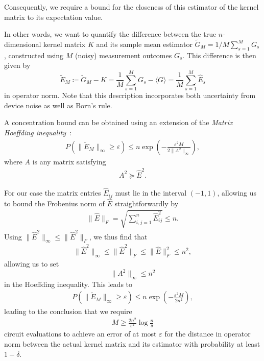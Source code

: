 \documentclass[twocolumn,superscriptaddress,nofootinbib]{revtex4-2}
\providecommand{\norm}[1]{\lVert #1 \rVert}
\renewcommand{\l}[0]{\langle}
\renewcommand{\r}[0]{\rangle}
\newcommand{\expval}[1]{\l #1 \r}
\begin{document}
    Consequently, we require a bound for the closeness of this estimator of the kernel matrix to its expectation value.
    
    In other words, we want to quantify the difference between the true $n$-dimensional kernel matrix $K$ and its sample mean estimator $\tilde{G}_M = 1/M\sum_{s=1}^M G_s$, constructed using $M$ (noisy) measurement outcomes $G_s$. This difference is then given by
    \begin{equation}
        \tilde{E}_M\coloneqq \tilde{G}_M-K = \frac{1}{M}\sum_{s=1}^M G_s - \expval{G}=\frac{1}{M}\sum_{s=1}^M\hat{E}_s
    \end{equation}
    in operator norm. Note that this description incorporates both uncertainty from device noise as well as Born's rule.
    
    A concentration bound can be obtained using an extension of the \emph{Matrix Hoeffding inequality}~\cite{troppUserfriendlyTailBounds2012a,mackeyMatrixConcentrationInequalities2014}:
    \begin{align}
        P(\lVert \tilde{E}_M \rVert_{\infty} \geq \varepsilon)
        \leq n \exp\left(- \frac{\varepsilon^2 M}{2 \norm{A^2}_{\infty}}\right),
    \end{align}
    where $A$ is any matrix satisfying
    \begin{align}
        A^2 \succcurlyeq \hat{E}^2.
    \end{align}

    For our case the matrix entries $\hat{E}_{ij}$ must lie in the interval $(-1,1)$, allowing us to bound the Frobenius norm of $\hat{E}$ straightforwardly by
    \begin{align}
        \lVert \hat{E} \rVert_F = \sqrt{\sum_{i,j=1}^n \hat{E}_{ij}^2} \leq n.
    \end{align}
    Using $\lVert \hat{E}^2 \rVert_\infty \leq \lVert \hat{E}^2 \rVert_F$, we thus find that 
    \begin{align}
        \lVert \hat{E}^2 \rVert_\infty \leq\lVert \hat{E}^2 \rVert_F \leq \lVert \hat{E}\rVert_F^2 \leq n^2,
    \end{align}
    allowing us to set
    \begin{equation}
        \norm{A^2}_{\infty}\leq n^2
    \end{equation}
    in the Hoeffding inequality. This leads to
        \begin{align}
        P(\lVert \tilde{E}_M \rVert_{\infty} \geq \varepsilon)
        \leq n \exp\left(- \frac{\varepsilon^2 M}{2 n^2}\right),
    \end{align}
    leading to the conclusion that we require
    \begin{align}
        M \geq \frac{2 n^2}{\varepsilon^2} \log \frac{n}{\delta}
    \end{align}
    circuit evaluations to achieve an error of at most $\varepsilon$ for the distance in operator norm between the actual kernel matrix and its estimator with probability at least $1-\delta$.
    
\end{document}
